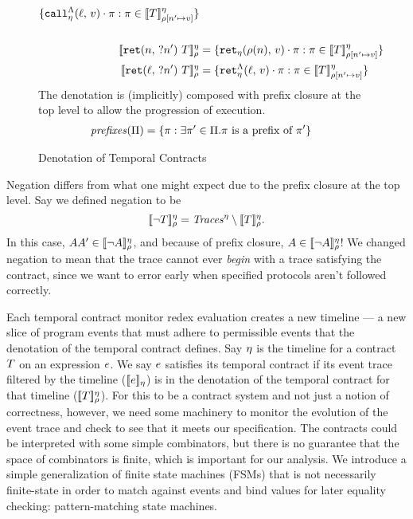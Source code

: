\documentclass[preprint,onecolumn,9pt]{sigplanconf} %
\begin{document}
\begin{figure}
\begin{align*}
   \setbuild{\aptopcall{\mtoplevelname}{\mval}{\mtimeline}\cdot \mtrace}{\mtrace \in \denotetcon{\mtcon}{\mtimeline}{\menv[\mname' \mapsto \mval]}}
\\
\\
   \denotetcon{\stret{\mname}{\mname'}{\mtcon}}{\mtimeline}{\menv} &=
   \setbuild{\apvret{\menv(\mname)}{\mval}{\mtimeline}\cdot \mtrace}{\mtrace \in \denotetcon{\mtcon}{\mtimeline}{\menv[\mname' \mapsto \mval]}}
\\
   \denotetcon{\stret{\mtoplevelname}{\mname'}{\mtcon}}{\mtimeline}{\menv} &=
   \setbuild{\aptopret{\mtoplevelname}{\mval}{\mtimeline}\cdot \mtrace}{\mtrace \in \denotetcon{\mtcon}{\mtimeline}{\menv[\mname' \mapsto \mval]}}
  \end{align*}
  The denotation is (implicitly) composed with prefix closure at the top level to allow the progression of execution.
  \begin{align*}
    \mathit{prefixes}(\Pi) &= \{\pi : \exists \pi' \in \Pi. \pi \text{ is a prefix of } \pi'\}
  \end{align*}
  \caption{Denotation of Temporal Contracts}
  \label{fig:tcontract-denotation}
\end{figure}

Negation differs from what one might expect due to the prefix closure at the top level.
%
Say we defined negation to be
\begin{equation*}
  [\![ \neg T ]\!]^{\eta}_{\rho} = \mathit{Traces}^\eta \setminus [\![ T ]\!]^{\eta}_{\rho}\text.
\end{equation*}
In this case, $AA' \in [\![ \neg A ]\!]^{\eta}_{\rho}$, and because of prefix closure, $A \in [\![ \neg A ]\!]^{\eta}_{\rho}$!
%
We changed negation to mean that the trace cannot ever \emph{begin} with a trace satisfying the contract, since we want to error early when specified protocols aren't followed correctly.

Each temporal contract monitor redex evaluation creates a new timeline --- a new slice of program events that must adhere to permissible events that the denotation of the temporal contract defines.
%
Say $\eta$ is the timeline for a contract $T$ on an expression $e$.
%
We say $e$ satisfies its temporal contract if its event trace filtered by the timeline ($[\![ e ]\!]_\eta$) is in the denotation of the temporal contract for that timeline ($[\![ T ]\!]^{\eta}_{\rho}$).
%
For this to be a contract system and not just a notion of correctness, however, we need some machinery to monitor the evolution of the event trace and check to see that it meets our specification.
%
The contracts could be interpreted with some simple combinators, but there is no guarantee that the space of combinators is finite, which is important for our analysis.
%
We introduce a simple generalization of finite state machines (FSMs) that is not necessarily finite-state in order to match against events and bind values for later equality checking: pattern-matching state machines.
\end{document}
